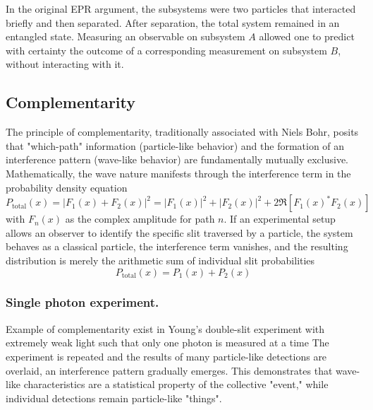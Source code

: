 \documentclass[../../../main.tex]{subfiles}
\begin{document}
In the original EPR argument, the subsystems were two particles that interacted briefly and then separated.
After separation, the total system remained in an entangled state.
Measuring an observable on subsystem $A$ allowed one to predict with certainty the outcome of a corresponding measurement on subsystem $B$, without interacting with it.

\subsection{Complementarity}
The principle of complementarity, traditionally associated with Niels Bohr, posits that "which-path" information (particle-like behavior) and the formation of an interference pattern (wave-like behavior) are fundamentally mutually exclusive.
Mathematically, the wave nature manifests through the interference term in the probability density equation
\begin{equation*}
  P_\text{total}(x) = |F_1(x)+F_2(x)|^2 = |F_1(x)|^2 +|F_2(x)|^2 +2 \mathfrak{R}[F_1(x)^* F_2(x)]
\end{equation*}
with $F_n(x)$ as the complex amplitude for path $n$.
If an experimental setup allows an observer to identify the specific slit traversed by a particle, the system behaves as a classical particle, the interference term vanishes, and the resulting distribution is merely the arithmetic sum of individual slit probabilities
\begin{equation*}
  P_\text{total}(x) = P_1(x)+P_2(x)
\end{equation*}

\subsubsection{Single photon experiment.}
Example of complementarity exist in Young's double-slit experiment with extremely weak light such that only one photon is measured at a time
The experiment is repeated and the results of many particle-like detections are overlaid, an interference pattern gradually emerges.
This demonstrates that wave-like characteristics are a statistical property of the collective "event," while individual detections remain particle-like "things".
\end{document}
